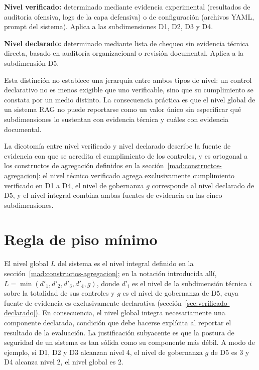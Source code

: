 \begin{infobox}
  \textbf{Nivel verificado:} determinado mediante evidencia experimental (resultados de auditoría ofensiva, logs de la capa defensiva) o de configuración (archivos YAML, prompt del sistema). Aplica a las subdimensiones D1, D2, D3 y D4.

  \textbf{Nivel declarado:} determinado mediante lista de chequeo sin evidencia técnica directa, basado en auditoría organizacional o revisión documental. Aplica a la subdimensión D5.
\end{infobox}

Esta distinción no establece una jerarquía entre ambos tipos de nivel: un control declarativo no es menos exigible que uno verificable, sino que su cumplimiento se constata por un medio distinto. La consecuencia práctica es que el nivel global de un sistema RAG no puede reportarse como un valor único sin especificar qué subdimensiones lo sustentan con evidencia técnica y cuáles con evidencia documental.

La dicotomía entre nivel verificado y nivel declarado describe la fuente de evidencia con que se acredita el cumplimiento de los controles, y es ortogonal a los constructos de agregación definidos en la sección~\ref{mad:constructos-agregacion}: el nivel técnico verificado agrega exclusivamente cumplimiento verificado en D1 a D4, el nivel de gobernanza $g$ corresponde al nivel declarado de D5, y el nivel integral combina ambas fuentes de evidencia en las cinco subdimensiones.

\section{Regla de piso mínimo}
\label{sec:piso-minimo}

El nivel global $L$ del sistema es el nivel integral definido en la sección~\ref{mad:constructos-agregacion}; en la notación introducida allí, $L = \min(d'_1, d'_2, d'_3, d'_4, g)$, donde $d'_i$ es el nivel de la subdimensión técnica $i$ sobre la totalidad de sus controles y $g$ es el nivel de gobernanza de D5, cuya fuente de evidencia es exclusivamente declarativa (sección~\ref{sec:verificado-declarado}). En consecuencia, el nivel global integra necesariamente una componente declarada, condición que debe hacerse explícita al reportar el resultado de la evaluación. La justificación subyacente es que la postura de seguridad de un sistema es tan sólida como su componente más débil. A modo de ejemplo, si D1, D2 y D3 alcanzan nivel 4, el nivel de gobernanza $g$ de D5 es 3 y D4 alcanza nivel 2, el nivel global es 2.

